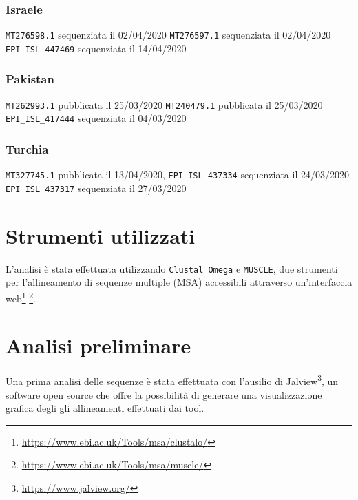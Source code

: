 \documentclass[11pt,italian]{article}
\makeatletter
\newcommand*{\lstitem}[1][]{%
  \setbox0\hbox\bgroup
    \patchcmd{\lst@InlineM}{\@empty}{\@empty\egroup\item[\usebox0]\leavevmode\ignorespaces}{}{}%
    \lstinline[#1]%
}
\makeatother
\begin{document}
\subsubsection*{Israele}
\begin{description}
    \lstitem{MT276598.1} sequenziata il 02/04/2020
    \lstitem{MT276597.1} sequenziata il 02/04/2020
    \lstitem{EPI_ISL_447469} sequenziata il 14/04/2020
\end{description}

\subsubsection*{Pakistan}
\begin{description}
    \lstitem{MT262993.1} pubblicata il 25/03/2020
    \lstitem{MT240479.1} pubblicata il 25/03/2020
    \lstitem{EPI_ISL_417444} sequenziata il 04/03/2020
\end{description}

\subsubsection*{Turchia}
\begin{description}
    \lstitem{MT327745.1} pubblicata il 13/04/2020,
    \lstitem{EPI_ISL_437334} sequenziata il 24/03/2020
    \lstitem{EPI_ISL_437317} sequenziata il 27/03/2020
\end{description}

\section{Strumenti utilizzati}
L'analisi è stata effettuata utilizzando \lstinline{Clustal Omega} e \lstinline{MUSCLE}, due strumenti per l'allineamento di sequenze multiple (MSA) accessibili attraverso un'interfaccia web\footnote{\url{https://www.ebi.ac.uk/Tools/msa/clustalo/}} \footnote{\url{https://www.ebi.ac.uk/Tools/msa/muscle/}}.

% \newpage
\section{Analisi preliminare}
\label{section:pre-analysis}
Una prima analisi delle sequenze è stata effettuata con l'ausilio di Jalview\footnote{\url{https://www.jalview.org/}}, un software open source che offre la possibilità di generare una visualizzazione grafica degli gli allineamenti effettuati dai tool.
\end{document}
